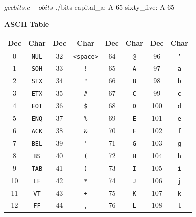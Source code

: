 \documentclass[12pt, oneside, landscape]{article}
\begin{document}
\begin{minipage}[t]{0.45\textwidth}
  

\begin{shell}[linewidth=30em,basicstyle=\ttfamily\scriptsize]
$ gcc bits.c -o bits
$ ./bits
capital_a:  A 65
sixty_five: A 65
\end{shell}

\end{minipage}
\begin{minipage}[t]{0.45\textwidth}

\textbf{\Large ASCII Table}

\vspace{1em}

\small

\begin{tabular}{|c|c||c|c||c|c||c|c|}
\hline
\textbf{Dec} & \textbf{Char} & \textbf{Dec} & \textbf{Char} & \textbf{Dec} & \textbf{Char} & \textbf{Dec} & \textbf{Char} \\
\hline
0   & \texttt{NUL} & 32  & \texttt{<space>} & 64  & \texttt{@} & 96  & \texttt{`} \\
1   & \texttt{SOH} & 33  & \texttt{!} & 65  & \texttt{A} & 97  & \texttt{a} \\
2   & \texttt{STX} & 34  & \texttt{"} & 66  & \texttt{B} & 98  & \texttt{b} \\
3   & \texttt{ETX} & 35  & \texttt{\#} & 67  & \texttt{C} & 99  & \texttt{c} \\
4   & \texttt{EOT} & 36  & \texttt{\$} & 68  & \texttt{D} & 100 & \texttt{d} \\
5   & \texttt{ENQ} & 37  & \texttt{\%} & 69  & \texttt{E} & 101 & \texttt{e} \\
6   & \texttt{ACK} & 38  & \texttt{\&} & 70  & \texttt{F} & 102 & \texttt{f} \\
7   & \texttt{BEL} & 39  & \texttt{'} & 71  & \texttt{G} & 103 & \texttt{g} \\
8   & \texttt{BS}  & 40  & \texttt{(} & 72  & \texttt{H} & 104 & \texttt{h} \\
9   & \texttt{TAB} & 41  & \texttt{)} & 73  & \texttt{I} & 105 & \texttt{i} \\
10  & \texttt{LF}  & 42  & \texttt{*} & 74  & \texttt{J} & 106 & \texttt{j} \\
11  & \texttt{VT}  & 43  & \texttt{+} & 75  & \texttt{K} & 107 & \texttt{k} \\
12  & \texttt{FF}  & 44  & \texttt{,} & 76  & \texttt{L} & 108 & \texttt{l} \\

\end{tabular}
\end{minipage}
\end{document}
